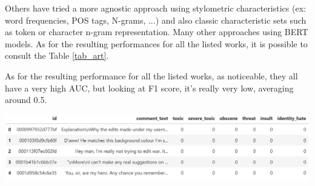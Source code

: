 \documentclass[10.5pt]{article}
\begin{document}
\begin{multicols*}{2}
Others have tried a more agnostic approach using stylometric characteristics (ex: word frequencies, POS tags, N-grams, ...) and also classic characteristic sets such as token or character n-gram representation. Many other approaches using BERT models. As for the resulting performances for all the listed works, it is possible to consult the Table \ref{tab_art}.

As for the resulting performance for all the listed works, as noticeable, they all have a very high AUC, but looking at F1 score, it's really very low, averaging around 0.5.

\end{multicols*}


\begin{center}
\centering %
\includegraphics[scale=0.37]{dataset_example.png}
\label{tab_dataset}
\end{center}
\end{document}
